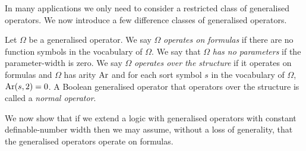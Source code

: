 \documentclass[../main/thesis.tex]{subfiles}
\begin{document}
In many applications we only need to consider a restricted class of generalised
operators. We now introduce a few difference classes of generalised operators.

\begin{definition}
  Let $\Omega$ be a generalised operator. We say $\Omega$ \emph{operates on
    formulas} if there are no function symbols in the vocabulary of $\Omega$. We
  say that $\Omega$ \emph{has no parameters} if the parameter-width is zero. We
  say $\Omega$ \emph{operates over the structure} if it operates on formulas and
  $\Omega$ has arity $\text{\upshape Ar}$ and for each sort symbol $s$ in the vocabulary of
  $\Omega$, $\text{\upshape Ar}(s, 2) = 0$. A Boolean generalised operator that operators over
  the structure is called a \emph{normal operator}.
\end{definition}

We now show that if we extend a logic with generalised operators with constant
definable-number width then we may assume, without a loss of generality, that
the generalised operators operate on formulas.
\end{document}
